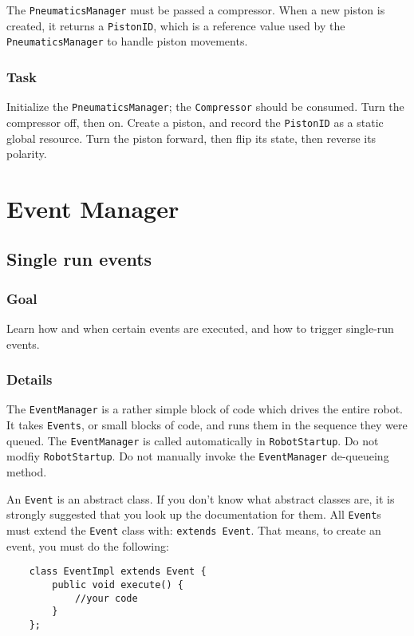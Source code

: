 \documentclass[a4paper]{article}
\begin{document}
The \lstinline{PneumaticsManager} must be passed a compressor. When a new piston is created, it returns a \lstinline{PistonID}, which is a reference value used by the \lstinline{PneumaticsManager} to handle piston movements.
\subsubsection{Task} Initialize the \lstinline{PneumaticsManager}; the \lstinline{Compressor} should be consumed. Turn the compressor off, then on. Create a piston, and record the \lstinline{PistonID} as a static global resource. Turn the piston forward, then flip its state, then reverse its polarity.


\pagebreak\section{Event Manager}\setcounter{subsection}{8}

\subsection{Single run events}
\subsubsection{Goal} Learn how and when certain events are executed, and how to trigger single-run events.
\subsubsection{Details} The \lstinline{EventManager} is a rather simple block of code which drives the entire robot. It takes \lstinline{Events}, or small blocks of code, and runs them in the sequence they were queued. The \lstinline{EventManager} is called automatically in \lstinline{RobotStartup}. Do not modfiy \lstinline{RobotStartup}. Do not manually invoke the \lstinline{EventManager} de-queueing method.

An \lstinline{Event} is an abstract class. If you don't know what abstract classes are, it is strongly suggested that you look up the documentation for them. All \lstinline{Event}s must extend the \lstinline{Event} class with: \lstinline{extends Event}. That means, to create an event, you must do the following:

\begin{lstlisting}
	class EventImpl extends Event {
		public void execute() {
			//your code
		}
	};
\end{lstlisting}
\end{document}
